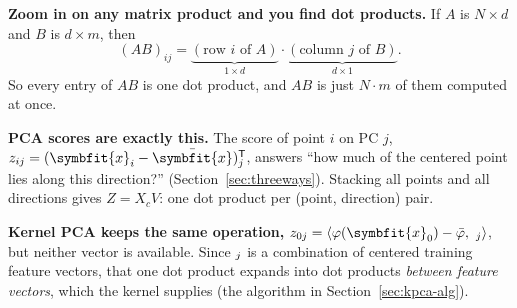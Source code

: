 \documentclass[11pt]{article}
\newcommand{\bm}[1]{\symbfit{#1}}
\newcommand{\vx}{\bm{x}}
\let\vv\relax\newcommand{\vv}{\bm{v}}
\newcommand{\xbar}{\bar{\bm{x}}}
\newcommand{\T}{^{\mathsf T}}
\begin{document}
\begin{intuition}
\textbf{Zoom in on any matrix product and you find dot products.} If $A$ is $N\times d$ and $B$ is $d\times m$, then
\[
(AB)_{ij}=\underbrace{(\text{row } i \text{ of } A)}_{1\times d}\cdot\underbrace{(\text{column } j \text{ of } B)}_{d\times 1}.
\]
So every entry of $AB$ is one dot product, and $AB$ is just $N\cdot m$ of them computed at once.

\begin{center}
\end{center}

\textbf{PCA scores are exactly this.} The score of point $i$ on PC $j$,
$z_{ij}=(\vx_i-\xbar)\T\vv_j$, answers ``how much of the centered point lies along this direction?'' (Section~\ref{sec:threeways}). Stacking
all points and all directions gives $Z=X_cV$: one dot product per (point, direction) pair.

\textbf{Kernel PCA keeps the same operation,} $z_{0j}=\langle\varphi(\vx_0)-\bar\varphi,\ \vv_j\rangle$, but neither vector is
available. Since $\vv_j$ is a combination of centered training feature vectors, that one dot product expands into
dot products \emph{between feature vectors}, which the kernel supplies (the algorithm in Section~\ref{sec:kpca-alg}).


\end{intuition}
\end{document}
